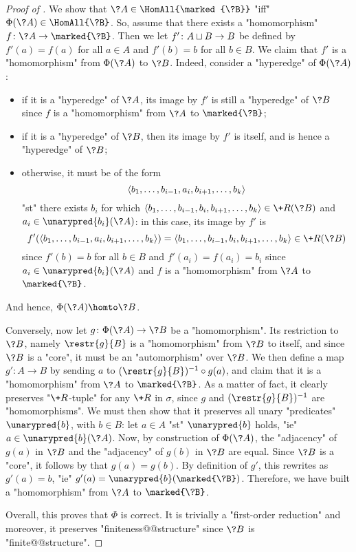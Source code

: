 \begin{proof}[Proof of ]
	We show that $\?A \in \HomAll{\marked{\?B}}$ "iff" $\Phi(\?A) \in \HomAll{\?B}$.
	So, assume that there exists a "homomorphism" $f\colon \?A \to \marked{\?B}$.
	Then we let $f'\colon A \sqcup B \to B$ be defined by $f'(a) = f(a)$ for all $a\in A$ and
	$f'(b) = b$ for all $b \in B$. We claim that $f'$ is a "homomorphism" from
	$\Phi(\?A)$ to $\?B$. Indeed, consider a "hyperedge" of $\Phi(\?A)$:
	\begin{itemize}
		\item if it is a "hyperedge" of $\?A$, its image by $f'$ is still a "hyperedge"
			of $\?B$ since $f$ is a "homomorphism" from $\?A$ to $\marked{\?B}$;
		\item if it is a "hyperedge" of $\?B$, then its image by $f'$ is itself, and is hence
			a "hyperedge" of $\?B$;
		\item otherwise, it must be of the form 
			\[\langle b_1,\dotsc,b_{i-1}, a_i, b_{i+1},\dotsc,b_k\rangle\]
			"st" there exists $b_i$ for which
			$\tup{b_1,\dotsc,b_{i-1}, b_i, b_{i+1},\dotsc,b_k} \in \+R(\?B)$
			and $a_i \in \unarypred{b_i}(\?A)$:
			in this case, its image by $f'$ is 
			\[f'(\tup{b_1,\dotsc,b_{i-1}, a_i, b_{i+1},\dotsc,b_k})
			= \tup{b_1,\dotsc,b_{i-1}, b_i, b_{i+1},\dotsc,b_k} \in \+R(\?B)\]
			since $f'(b) = b$ for all $b\in B$ and $f'(a_i) = f(a_i) = b_i$ since
			$a_i \in \unarypred{b_i}(\?A)$ and $f$ is a "homomorphism" from
			$\?A$ to $\marked{\?B}$.
	\end{itemize}
	And hence, $\Phi(\?A) \homto \?B$.

	Conversely, now let $g\colon \Phi(\?A) \to \?B$ be a "homomorphism".
	Its restriction to $\?B$, namely $\restr{g}{B}$ is a "homomorphism" from $\?B$
	to itself, and since $\?B$ is a "core", it must be an "automorphism" over $\?B$.
	We then define a map $g' \colon A \to B$ by sending
	$a$ to $(\restr{g}{B})^{-1}\circ g(a)$, and claim that it is a "homomorphism"
	from $\?A$ to $\marked{\?B}$. As a matter of fact, it clearly preserves "$\+R$-tuple"
	for any $\+R$ in $\sigma$, since $g$ and $(\restr{g}{B})^{-1}$ are "homomorphisms".
	We must then show that it preserves all unary "predicates" $\unarypred{b}$, with $b\in B$:
	let $a \in A$ "st" $\unarypred{b}$ holds, "ie" $a \in \unarypred{b}(\?A)$.
	Now, by construction of $\Phi(\?A)$, the "adjacency" of $g(a)$ in $\?B$
	and the "adjacency" of $g(b)$ in $\?B$ are equal.
	Since $\?B$ is a "core", it follows by  that $g(a) = g(b)$.
	By definition of $g'$, this rewrites as $g'(a) = b$, "ie" $g'(a) = \unarypred{b}(\marked{\?B})$.
	Therefore, we have built a "homomorphism" from $\?A$ to $\marked{\?B}$.

	Overall, this proves that $\Phi$ is correct.
	It is trivially a "first-order reduction" and moreover,
	it preserves "finiteness@@structure" since $\?B$
	is "finite@@structure".
\end{proof}


